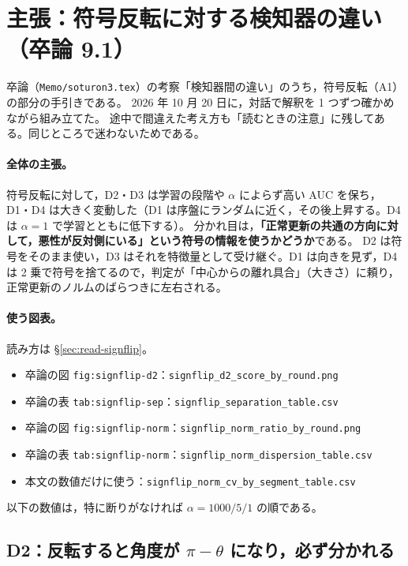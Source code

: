 \documentclass[a4j, dvipdfmx]{jsarticle}  %
\begin{document}
\section{主張：符号反転に対する検知器の違い（卒論 9.1）}
\label{sec:claim-sf}
\label{sec:claim-d1sf}

卒論（\texttt{Memo/soturon3.tex}）の考察「検知器間の違い」のうち，符号反転（A1）の部分の手引きである。
2026 年 10 月 20 日に，対話で解釈を 1 つずつ確かめながら組み立てた。
途中で間違えた考え方も「読むときの注意」に残してある。同じところで迷わないためである。

\paragraph{全体の主張。}
符号反転に対して，D2・D3 は学習の段階や $\alpha$ によらず高い AUC を保ち，D1・D4 は大きく変動した（D1 は序盤にランダムに近く，その後上昇する。D4 は $\alpha = 1$ で学習とともに低下する）。
分かれ目は，\textbf{「正常更新の共通の方向に対して，悪性が反対側にいる」という符号の情報を使うかどうか}である。
D2 は符号をそのまま使い，D3 はそれを特徴量として受け継ぐ。D1 は向きを見ず，D4 は 2 乗で符号を捨てるので，判定が「中心からの離れ具合」（大きさ）に頼り，正常更新のノルムのばらつきに左右される。

\paragraph{使う図表。}読み方は \S\ref{sec:read-signflip}。
\begin{itemize}
  \item 卒論の図 \texttt{fig:signflip-d2}：\texttt{signflip\_d2\_score\_by\_round.png}
  \item 卒論の表 \texttt{tab:signflip-sep}：\texttt{signflip\_separation\_table.csv}
  \item 卒論の図 \texttt{fig:signflip-norm}：\texttt{signflip\_norm\_ratio\_by\_round.png}
  \item 卒論の表 \texttt{tab:signflip-norm}：\texttt{signflip\_norm\_dispersion\_table.csv}
  \item 本文の数値だけに使う：\texttt{signflip\_norm\_cv\_by\_segment\_table.csv}
\end{itemize}
以下の数値は，特に断りがなければ $\alpha = 1000 / 5 / 1$ の順である。

\subsection{D2：反転すると角度が $\pi - \theta$ になり，必ず分かれる}
\label{sec:claim-sf-d2}
\end{document}
